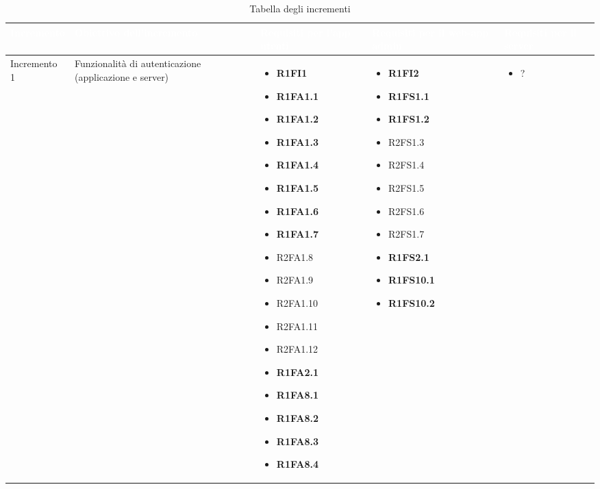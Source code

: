 {
\renewcommand{\arraystretch}{2}
\centering
	
\begin{longtable}{C{2.5cm} C{3.2cm} C{2.8cm} C{2.8cm} C{2.8cm}}
\caption{Tabella degli incrementi}\\
\textcolor{white}{\textbf{Incremento}} &
\textcolor{white}{\textbf{Obiettivo dell'incremento}} & 
\textcolor{white}{\textbf{Requisiti per l'app utenti}} &
\textcolor{white}{\textbf{Requisiti per il web-app admin}} &
\textcolor{white}{\textbf{Requisiti per il server}} \\
\endhead

Incremento 1 & Funzionalità di autenticazione (applicazione e server) & \begin{itemize}
    \item[ ] \textbf{R1FI1}
    \item[ ] \textbf{R1FA1.1}
    \item[ ] \textbf{R1FA1.2}
    \item[ ] \textbf{R1FA1.3}
    \item[ ] \textbf{R1FA1.4}
    \item[ ] \textbf{R1FA1.5}
    \item[ ] \textbf{R1FA1.6}
    \item[ ] \textbf{R1FA1.7}
    \item[ ] R2FA1.8
    \item[ ] R2FA1.9
    \item[ ] R2FA1.10
    \item[ ] R2FA1.11
    \item[ ] R2FA1.12 
    \item[ ] \textbf{R1FA2.1}
    \item[ ] \textbf{R1FA8.1}
    \item[ ] \textbf{R1FA8.2}
    \item[ ] \textbf{R1FA8.3}
    \item[ ] \textbf{R1FA8.4}
\end{itemize} & \begin{itemize} 
    \item[ ] \textbf{R1FI2}
    \item[ ] \textbf{R1FS1.1}
    \item[ ] \textbf{R1FS1.2}
    \item[ ] R2FS1.3
    \item[ ] R2FS1.4
    \item[ ] R2FS1.5
    \item[ ] R2FS1.6
    \item[ ] R2FS1.7
    \item[ ] \textbf{R1FS2.1}
    \item[ ] \textbf{R1FS10.1}
    \item[ ] \textbf{R1FS10.2}
\end{itemize}& \begin{itemize} 
    \item[ ] ?
\end{itemize}\\


\end{longtable}}

